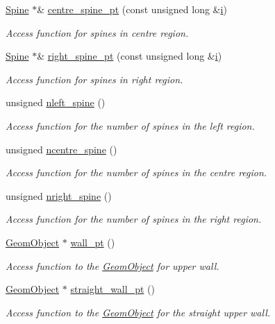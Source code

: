\begin{DoxyCompactItemize}
\hyperlink{classoomph_1_1Spine}{Spine} $\ast$\& \hyperlink{classoomph_1_1ChannelSpineMesh_a690cda061ec45945d981a24a2b206e69}{centre\+\_\+spine\+\_\+pt} (const unsigned long \&\hyperlink{cfortran_8h_adb50e893b86b3e55e751a42eab3cba82}{i})
\begin{DoxyCompactList}\small\item\em Access function for spines in centre region. \end{DoxyCompactList}\item 
\hyperlink{classoomph_1_1Spine}{Spine} $\ast$\& \hyperlink{classoomph_1_1ChannelSpineMesh_a78a52a2e61a76bff0fa74b3fd2583092}{right\+\_\+spine\+\_\+pt} (const unsigned long \&\hyperlink{cfortran_8h_adb50e893b86b3e55e751a42eab3cba82}{i})
\begin{DoxyCompactList}\small\item\em Access function for spines in right region. \end{DoxyCompactList}\item 
unsigned \hyperlink{classoomph_1_1ChannelSpineMesh_af5ae7133c9939b90779f0809143676bd}{nleft\+\_\+spine} ()
\begin{DoxyCompactList}\small\item\em Access function for the number of spines in the left region. \end{DoxyCompactList}\item 
unsigned \hyperlink{classoomph_1_1ChannelSpineMesh_a85fa0910148e6aa5d8a1995ece5feeae}{ncentre\+\_\+spine} ()
\begin{DoxyCompactList}\small\item\em Access function for the number of spines in the centre region. \end{DoxyCompactList}\item 
unsigned \hyperlink{classoomph_1_1ChannelSpineMesh_a48ee9b7736e6884ff41e2affd4094842}{nright\+\_\+spine} ()
\begin{DoxyCompactList}\small\item\em Access function for the number of spines in the right region. \end{DoxyCompactList}\item 
\hyperlink{classoomph_1_1GeomObject}{Geom\+Object} $\ast$ \hyperlink{classoomph_1_1ChannelSpineMesh_a741893ef460f1275f1df43496bb7536c}{wall\+\_\+pt} ()
\begin{DoxyCompactList}\small\item\em Access function to the \hyperlink{classoomph_1_1GeomObject}{Geom\+Object} for upper wall. \end{DoxyCompactList}\item 
\hyperlink{classoomph_1_1GeomObject}{Geom\+Object} $\ast$ \hyperlink{classoomph_1_1ChannelSpineMesh_a54818e02db7026d39451f5f502e1cf11}{straight\+\_\+wall\+\_\+pt} ()
\begin{DoxyCompactList}\small\item\em Access function to the \hyperlink{classoomph_1_1GeomObject}{Geom\+Object} for the straight upper wall. \end{DoxyCompactList}\end{DoxyCompactItemize}
